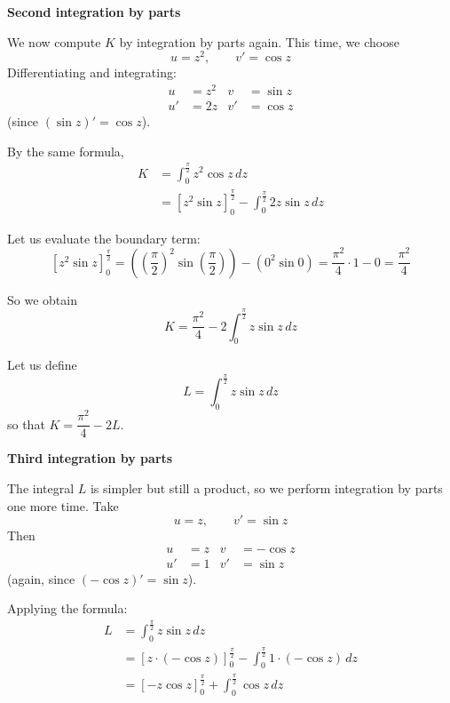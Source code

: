 \begin{solution}
    \medskip
    \noindent\textbf{Second integration by parts}

    We now compute $K$ by integration by parts again. This time, we choose
    \[
        u = z^2, \qquad v' = \cos z
    \]
    Differentiating and integrating:
    \begin{align*}
        u &= z^2       & v &= \sin z \\
        u' &= 2z       & v' &= \cos z
    \end{align*}
    (since $(\sin z)' = \cos z$).

    By the same formula,
    \begin{align*}
        K &= \int_0^{\frac{\pi}{2}} z^2 \cos z \, dz \\
          &= \left[ z^2 \sin z \right]_0^{\frac{\pi}{2}} - \int_0^{\frac{\pi}{2}} 2z \sin z \, dz
    \end{align*}

    Let us evaluate the boundary term:
    \[
        \left[ z^2 \sin z \right]_0^{\frac{\pi}{2}}
        = \left(\left(\frac{\pi}{2}\right)^2 \sin\left(\frac{\pi}{2}\right)\right) - (0^2 \sin 0)
        = \frac{\pi^2}{4} \cdot 1 - 0
        = \frac{\pi^2}{4}
    \]

    So we obtain
    \[
        K = \frac{\pi^2}{4} - 2 \int_0^{\frac{\pi}{2}} z \sin z \, dz
    \]

    Let us define
    \[
        L = \int_0^{\frac{\pi}{2}} z \sin z \, dz
    \]
    so that $K = \dfrac{\pi^2}{4} - 2L$.

    \medskip
    \noindent\textbf{Third integration by parts}

    The integral $L$ is simpler but still a product, so we perform integration by parts one more time.  
    Take
    \[
        u = z, \qquad v' = \sin z
    \]
    Then
    \begin{align*}
        u &= z          & v &= -\cos z \\
        u' &= 1         & v' &= \sin z
    \end{align*}
    (again, since $( -\cos z)' = \sin z$).

    Applying the formula:
    \begin{align*}
        L &= \int_0^{\frac{\pi}{2}} z \sin z \, dz \\
          &= \left[ z \cdot (-\cos z) \right]_0^{\frac{\pi}{2}} - \int_0^{\frac{\pi}{2}} 1 \cdot (-\cos z) \, dz \\
          &= \left[ -z \cos z \right]_0^{\frac{\pi}{2}} + \int_0^{\frac{\pi}{2}} \cos z \, dz
    \end{align*}


\end{solution}
